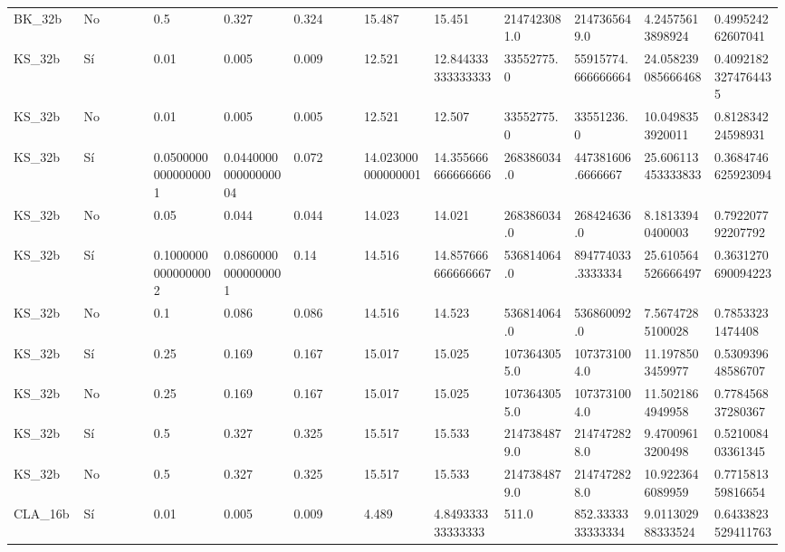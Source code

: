 {{\begin{longtable}{M{0.09\linewidth}M{0.09\linewidth}M{0.09\linewidth}M{0.09\linewidth}M{0.09\linewidth}M{0.09\linewidth}M{0.09\linewidth}M{0.09\linewidth}M{0.09\linewidth}M{0.09\linewidth}M{0.09\linewidth}}
BK\_32b & No & \num{0.5} & \num{0.327} & \num{0.324} & \num{15.487} & \num{15.451} & \num{2147423081.0} & \num{2147365649.0} & \num{4.24575613898924} & \num{0.499524262607041} \\
KS\_32b & Sí & \num{0.01} & \num{0.005} & \num{0.009} & \num{12.521} & \num{12.844333333333333} & \num{33552775.0} & \num{55915774.666666664} & \num{24.058239085666468} & \num{0.40921823274764435} \\
KS\_32b & No & \num{0.01} & \num{0.005} & \num{0.005} & \num{12.521} & \num{12.507} & \num{33552775.0} & \num{33551236.0} & \num{10.0498353920011} & \num{0.812834224598931} \\
KS\_32b & Sí & \num{0.05000000000000001} & \num{0.044000000000000004} & \num{0.072} & \num{14.023000000000001} & \num{14.355666666666666} & \num{268386034.0} & \num{447381606.6666667} & \num{25.606113453333833} & \num{0.3684746625923094} \\
KS\_32b & No & \num{0.05} & \num{0.044} & \num{0.044} & \num{14.023} & \num{14.021} & \num{268386034.0} & \num{268424636.0} & \num{8.18133940400003} & \num{0.792207792207792} \\
KS\_32b & Sí & \num{0.10000000000000002} & \num{0.08600000000000001} & \num{0.14} & \num{14.516} & \num{14.857666666666667} & \num{536814064.0} & \num{894774033.3333334} & \num{25.610564526666497} & \num{0.3631270690094223} \\
KS\_32b & No & \num{0.1} & \num{0.086} & \num{0.086} & \num{14.516} & \num{14.523} & \num{536814064.0} & \num{536860092.0} & \num{7.56747285100028} & \num{0.78533231474408} \\
KS\_32b & Sí & \num{0.25} & \num{0.169} & \num{0.167} & \num{15.017} & \num{15.025} & \num{1073643055.0} & \num{1073731004.0} & \num{11.1978503459977} & \num{0.530939648586707} \\
KS\_32b & No & \num{0.25} & \num{0.169} & \num{0.167} & \num{15.017} & \num{15.025} & \num{1073643055.0} & \num{1073731004.0} & \num{11.5021864949958} & \num{0.778456837280367} \\
KS\_32b & Sí & \num{0.5} & \num{0.327} & \num{0.325} & \num{15.517} & \num{15.533} & \num{2147384879.0} & \num{2147472828.0} & \num{9.47009613200498} & \num{0.521008403361345} \\
KS\_32b & No & \num{0.5} & \num{0.327} & \num{0.325} & \num{15.517} & \num{15.533} & \num{2147384879.0} & \num{2147472828.0} & \num{10.9223646089959} & \num{0.771581359816654} \\
CLA\_16b & Sí & \num{0.01} & \num{0.005} & \num{0.009} & \num{4.489} & \num{4.849333333333333} & \num{511.0} & \num{852.3333333333334} & \num{9.011302988333524} & \num{0.6433823529411763} \\

\end{longtable}}}
